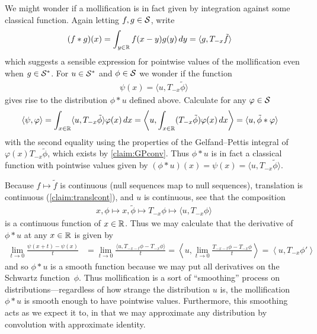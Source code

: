     We might wonder if a mollification is in fact given by integration against some classical function.
    Again letting $f,g\in\S$, write
    \begin{align*}
      (f*g)(x)
      &= \int_{y\in\R} f(x-y)g(y)\,dy
      = \langle g, T_{-x}\tilde f\rangle
    \end{align*}
    which suggests a sensible expression for pointwise values of the mollification even when $g\in\SS$.
    For $u\in\SS$ and $\phi\in\S$ we wonder if the function
    \begin{align*}
      \psi(x) = \langle u, T_{-x}\tilde\phi\rangle
    \end{align*}
    gives rise to the distribution $\phi*u$ defined above.
    Calculate for any $\varphi\in\S$
    \begin{align*}
      \left\langle \psi, \varphi \right\rangle
      &= \int_{x\in\R} \langle u,T_{-x}\tilde\phi\rangle\varphi(x)\,dx
      = \left\langle u, \int_{x\in\R} (T_{-x}\tilde\phi)\varphi(x)\,dx \right\rangle
      = \langle u, \tilde\phi*\varphi\rangle
    \end{align*}
    with the second equality using the properties of the Gelfand--Pettis integral of $\varphi(x)T_{-x}\tilde\phi$, which exists by \cref{claim:GPconv}.
    Thus $\phi*u$ is in fact a classical function with pointwise values given by $(\phi*u)(x)=\psi(x)=\langle u, T_{-x}\tilde\phi\rangle$.

    Because $f\mapsto\tilde f$ is continuous (null sequences map to null sequences), translation is continuous (\cref{claim:translcont}), and $u$ is continuous, see that the composition
    \begin{align*}
      x, \phi \mapsto x, \tilde\phi \mapsto T_{-x}\phi \mapsto \langle u, T_{-x}\phi \rangle
    \end{align*}
    is a continuous function of $x\in\R$.
    Thus we may calculate that the derivative of $\phi*u$ at any $x\in\R$ is given by
    \begin{align*}
      \lim_{t\rightarrow0} \frac{\psi(x+t) - \psi(x)}{t}
      &= \lim_{t\rightarrow0} \frac{\langle u, T_{-x-t}\phi-T_{-x}\phi\rangle}{t}
      = \left\langle u, \lim_{t\rightarrow0} \frac{T_{-x-t}\phi-T_{-x}\phi}{t}\right\rangle
      = \left\langle u, T_{-x}\phi'\right\rangle
    \end{align*}
    and so $\phi*u$ is a smooth function because we may put all derivatives on the Schwartz function~$\phi$.
    Thus mollification is a sort of ``smoothing'' process on distributions---regardless of how strange the distribution $u$ is, the mollification $\phi*u$ is smooth enough to have pointwise values.
    Furthermore, this smoothing acts as we expect it to, in that we may approximate any distribution by convolution with approximate identity. 

